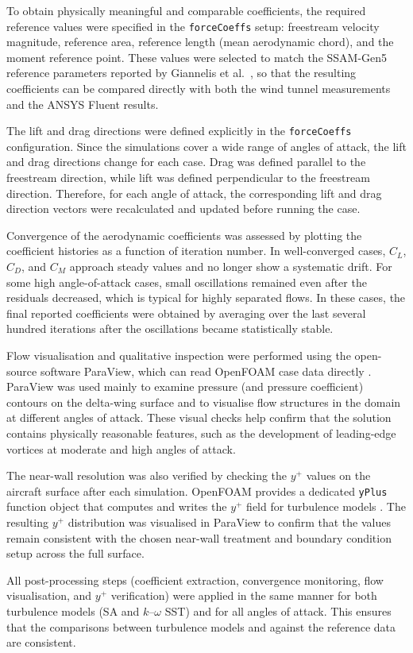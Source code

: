 To obtain physically meaningful and comparable coefficients, the required reference values were specified in the \texttt{forceCoeffs} setup: freestream velocity magnitude, reference area, reference length (mean aerodynamic chord), and the moment reference point. These values were selected to match the SSAM-Gen5 reference parameters reported by Giannelis et al.~\cite{Giannelis2023SSAMGen5}, so that the resulting coefficients can be compared directly with both the wind tunnel measurements and the ANSYS Fluent results.

The lift and drag directions were defined explicitly in the \texttt{forceCoeffs} configuration. Since the simulations cover a wide range of angles of attack, the lift and drag directions change for each case. Drag was defined parallel to the freestream direction, while lift was defined perpendicular to the freestream direction. Therefore, for each angle of attack, the corresponding lift and drag direction vectors were recalculated and updated before running the case.

Convergence of the aerodynamic coefficients was assessed by plotting the coefficient histories as a function of iteration number. In well-converged cases, $C_L$, $C_D$, and $C_M$ approach steady values and no longer show a systematic drift. For some high angle-of-attack cases, small oscillations remained even after the residuals decreased, which is typical for highly separated flows. In these cases, the final reported coefficients were obtained by averaging over the last several hundred iterations after the oscillations became statistically stable.

Flow visualisation and qualitative inspection were performed using the open-source software ParaView, which can read OpenFOAM case data directly \cite{Ahrens2005ParaView}. ParaView was used mainly to examine pressure (and pressure coefficient) contours on the delta-wing surface and to visualise flow structures in the domain at different angles of attack. These visual checks help confirm that the solution contains physically reasonable features, such as the development of leading-edge vortices at moderate and high angles of attack.

The near-wall resolution was also verified by checking the $y^{+}$ values on the aircraft surface after each simulation. OpenFOAM provides a dedicated \texttt{yPlus} function object that computes and writes the $y^{+}$ field for turbulence models \cite{OpenFOAMyPlus}. The resulting $y^{+}$ distribution was visualised in ParaView to confirm that the values remain consistent with the chosen near-wall treatment and boundary condition setup across the full surface.

All post-processing steps (coefficient extraction, convergence monitoring, flow visualisation, and $y^{+}$ verification) were applied in the same manner for both turbulence models (SA and $k$--$\omega$ SST) and for all angles of attack. This ensures that the comparisons between turbulence models and against the reference data are consistent.

